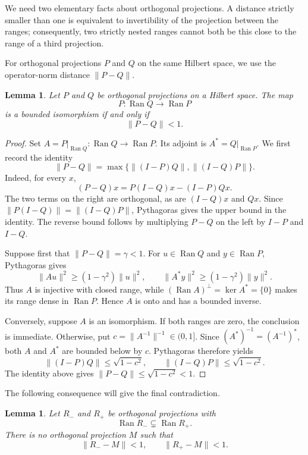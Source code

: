 \documentclass[a4paper,12pt,reqno]{amsart}
\newcommand{\lead}[1]{\par\smallskip\noindent\leavevmode#1\par\smallskip}
\newtheorem{lemma}[theorem]{Lemma}
\theoremstyle{remark}
\numberwithin{equation}{section}
\DeclareMathOperator{\Ran}{Ran}
\begin{document}
\lead{We need two elementary facts about orthogonal projections. A distance
strictly smaller than one is equivalent to invertibility of the projection
between the ranges; consequently, two strictly nested ranges cannot both
be this close to the range of a third projection.}


For orthogonal projections $P$ and $Q$ on the same Hilbert space, we use
the operator-norm distance $\|P-Q\|$.


\begin{lemma}\label{lem:projection-distance}
Let $P$ and $Q$ be orthogonal projections on a Hilbert space.  The map
\[
 P:\Ran Q\longrightarrow\Ran P
\]
is a bounded isomorphism if and only if
\begin{equation}\label{eq:projection-distance}
 \|P-Q\|<1.
\end{equation}
\end{lemma}

\begin{proof}
Set $A=P|_{\Ran Q}:\Ran Q\to\Ran P$. Its adjoint is
$A^*=Q|_{\Ran P}$. We first record the identity
\[
 \|P-Q\|
 =\max\{\|(I-P)Q\|,\|(I-Q)P\|\}.
\]
Indeed, for every $x$,
\[
 (P-Q)x=P(I-Q)x-(I-P)Qx.
\]
The two terms on the right are orthogonal, as are $(I-Q)x$ and $Qx$.
Since $\|P(I-Q)\|=\|(I-Q)P\|$, Pythagoras gives the upper bound in
the identity. The reverse bound follows by multiplying $P-Q$ on the left
by $I-P$ and $I-Q$.


Suppose first that $\|P-Q\|=\gamma<1$. For $u\in\Ran Q$ and
$y\in\Ran P$, Pythagoras gives
\[
 \|Au\|^2\geq(1-\gamma^2)\|u\|^2,
 \qquad
 \|A^*y\|^2\geq(1-\gamma^2)\|y\|^2.
\]
Thus $A$ is injective with closed range, while
$(\Ran A)^\perp=\ker A^*=\{0\}$ makes its range dense in $\Ran P$.
Hence $A$ is onto and has a bounded inverse.

Conversely, suppose $A$ is an isomorphism. If both ranges are zero, the
conclusion is immediate. Otherwise, put
$c=\|A^{-1}\|^{-1}\in(0,1]$. Since
$(A^*)^{-1}=(A^{-1})^*$, both $A$ and $A^*$ are bounded below by $c$.
Pythagoras therefore yields
\[
 \|(I-P)Q\|\leq\sqrt{1-c^2},
 \qquad
 \|(I-Q)P\|\leq\sqrt{1-c^2}.
\]
The identity above gives $\|P-Q\|\leq\sqrt{1-c^2}<1$.
\end{proof}

The following consequence will give the final contradiction.

\begin{lemma}\label{lem:inclusion}
Let $R_-$ and $R_+$ be orthogonal projections with
\[
 \Ran R_-\subsetneq\Ran R_+.
\]
There is no orthogonal projection $M$ such that
\[
 \|R_--M\|<1,
 \qquad
 \|R_+-M\|<1.
\]
\end{lemma}
\end{document}
